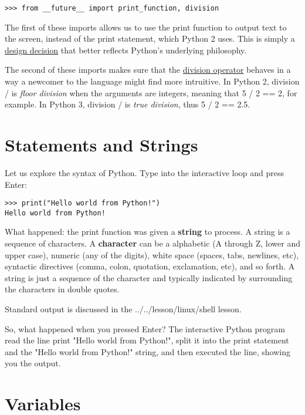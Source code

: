\begin{verbatim}
>>> from __future__ import print_function, division
\end{verbatim}

The first of these imports allows us to use the print function to output
text to the screen, instead of the print statement, which Python 2 uses.
This is simply a \href{https://www.python.org/dev/peps/pep-3105/}{design
decision} that better reflects Python's underlying philosophy.

The second of these imports makes sure that the
\href{https://www.python.org/dev/peps/pep-0238/}{division operator}
behaves in a way a newcomer to the language might find more intruitive.
In Python 2, division / is \emph{floor division} when the arguments are
integers, meaning that 5 / 2 == 2, for example. In Python 3, division /
is \emph{true division}, thus 5 / 2 == 2.5.

\section{Statements and Strings}\label{statements-and-strings}

Let us explore the syntax of Python. Type into the interactive loop and
press Enter:

\begin{verbatim}
>>> print("Hello world from Python!")
Hello world from Python!
\end{verbatim}

What happened: the print function was given a \textbf{string} to
process. A string is a sequence of characters. A \textbf{character} can
be a alphabetic (A through Z, lower and upper case), numeric (any of the
digits), white space (spaces, tabs, newlines, etc), syntactic directives
(comma, colon, quotation, exclamation, etc), and so forth. A string is
just a sequence of the character and typically indicated by surrounding
the characters in double quotes.

Standard output is discussed in the ../../lesson/linux/shell lesson.

So, what happened when you pressed Enter? The interactive Python program
read the line print "Hello world from Python!", split it into the print
statement and the "Hello world from Python!" string, and then executed
the line, showing you the output.

\section{Variables}\label{variables}

